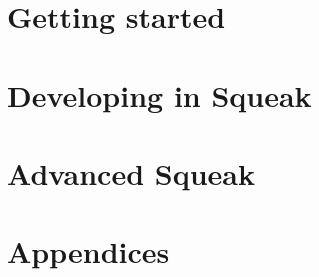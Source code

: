 \documentclass[a4paper,10pt,twoside]{book}
\begin{document}
\vfill
\newpage

%
\tableofcontents

\mainmatter
\part{Getting started}




\part{Developing in Squeak}







\part{Advanced Squeak}

\appendix
\part{Appendices}



{\small\raggedright\printindex}
\pagestyle{empty}
\cleardoublepage
~ %
\cleardoublepage
~ %
\cleardoublepage
\end{document}
